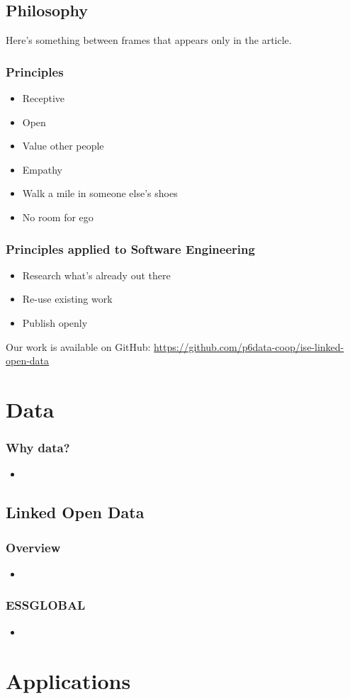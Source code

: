 \subsection{Philosophy}
Here's something between frames that appears only in the article.
\frame
{
  \frametitle{Principles}
  \begin{itemize}
    \item Receptive
    \item Open
    \item Value other people
    \item Empathy
    \item Walk a mile in someone else's shoes
    \item No room for ego
  \end{itemize}
}
\frame
{
  \frametitle{Principles applied to Software Engineering}
  \begin{itemize}
    \item Research what's already out there
    \item Re-use existing work
    \item Publish openly
  \end{itemize}
}
Our work is available on GitHub: \url{https://github.com/p6data-coop/ise-linked-open-data}
\section{Data}
\frame
{
  \frametitle{Why data?}
  \begin{itemize}
    \item
  \end{itemize}
}
\subsection{Linked Open Data}
\frame
{
  \frametitle{Overview}
  \begin{itemize}
    \item
  \end{itemize}
}
\frame
{
  \frametitle{ESSGLOBAL}
  \begin{itemize}
    \item
  \end{itemize}
}
\section{Applications}
